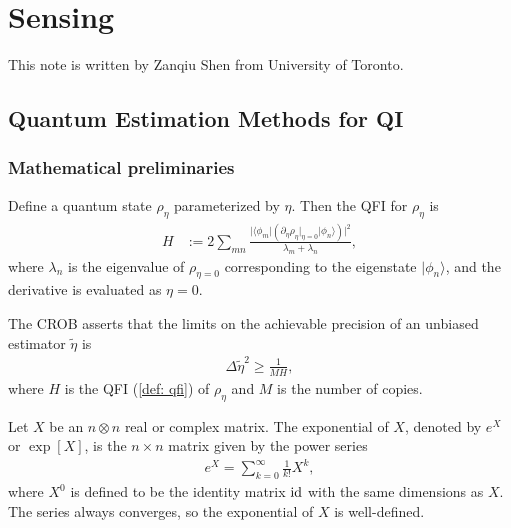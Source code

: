 \documentclass[../../note.tex]{subfiles}
\begin{document}
\chapter{Sensing}
This note is written by Zanqiu Shen from University of Toronto.

\section{Quantum Estimation Methods for QI \cite{sanz2017quantum}}
\subsection{Mathematical preliminaries}
\begin{definition}
    \label{dfe: qfi}
    Define a quantum state $\rho_{\eta}$ parameterized by $\eta$. Then the QFI for $\rho_{\eta}$ is
    \begin{align}
        H
        &:= 2 \sum_{mn} \frac{\vert \langle \phi_m \vert (\partial_{\eta}\rho_{\eta}\vert_{\eta=0}\vert \phi_{n}\rangle)\vert^2}{\lambda_m + \lambda_n},
    \end{align}
    where $\lambda_n$ is the eigenvalue of $\rho_{\eta=0}$ corresponding to the eigenstate $\vert \phi_n \rangle$, and the derivative is evaluated as $\eta=0$.
\end{definition}

\begin{definition}
    \label{def: crob}
    The CROB asserts that the limits on the achievable precision of an unbiased estimator $\tilde{\eta}$ is
    \begin{align}
        \Delta \tilde{\eta}^2 \geq \frac{1}{MH},
    \end{align}
    where $H$ is the QFI (\ref{def: qfi}) of $\rho_{\eta}$ and $M$ is the number of copies. 
\end{definition}

\begin{theorem}
    \label{thm: cct}
    
\end{theorem}

\begin{definition}
    \label{def: matrix exponential}
    Let $X$ be an $n \otimes n$ real or complex matrix. The exponential of $X$, denoted by $e^X$ or $\exp[X]$, is the $n \times n$ matrix given by the power series
    \begin{align}
        e^X = \sum_{k=0}^{\infty} \frac{1}{k!} X^k,
    \end{align}
    where $X^0$ is defined to be the identity matrix $\operatorname{id}$ with the same dimensions as $X$. The series always converges, so the exponential of $X$ is well-defined.
\end{definition}
\end{document}
